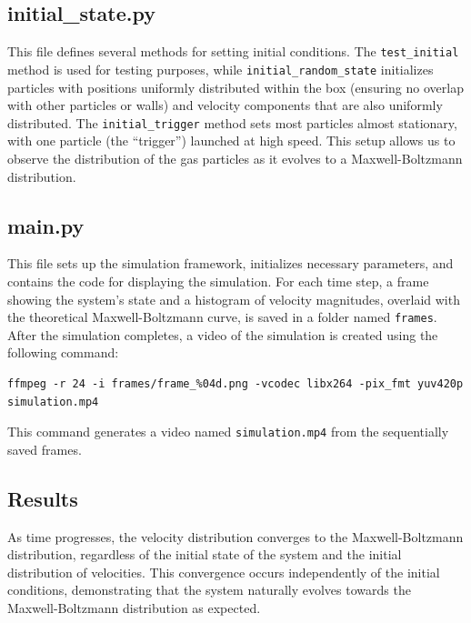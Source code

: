 \documentclass{article}
\begin{document}
\subsection{initial\_state.py}
This file defines several methods for setting initial conditions. The \texttt{test\_initial} method is used for testing purposes, while \texttt{initial\_random\_state} initializes particles with positions uniformly distributed within the box (ensuring no overlap with other particles or walls) and velocity components that are also uniformly distributed. The \texttt{initial\_trigger} method sets most particles almost stationary, with one particle (the ``trigger'') launched at high speed. This setup allows us to observe the distribution of the gas particles as it evolves to a Maxwell-Boltzmann distribution.

\subsection{main.py}
This file sets up the simulation framework, initializes necessary parameters, and contains the code for displaying the simulation. For each time step, a frame showing the system's state and a histogram of velocity magnitudes, overlaid with the theoretical Maxwell-Boltzmann curve, is saved in a folder named \texttt{frames}. After the simulation completes, a video of the simulation is created using the following command:

\begin{verbatim}
ffmpeg -r 24 -i frames/frame_%04d.png -vcodec libx264 -pix_fmt yuv420p simulation.mp4
\end{verbatim}

This command generates a video named \texttt{simulation.mp4} from the sequentially saved frames.

\subsection{Results}
As time progresses, the velocity distribution converges to the Maxwell-Boltzmann distribution, regardless of the initial state of the system and the initial distribution of velocities. This convergence occurs independently of the initial conditions, demonstrating that the system naturally evolves towards the Maxwell-Boltzmann distribution as expected.
\end{document}
